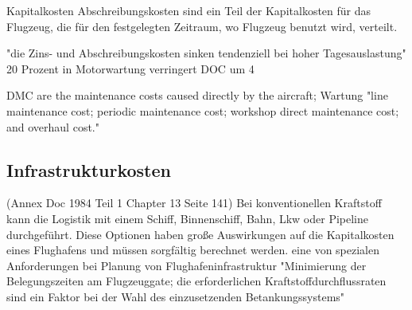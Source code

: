 Kapitalkosten
Abschreibungskosten sind ein Teil der Kapitalkosten für das Flugzeug, die für den festgelegten Zeitraum, wo Flugzeug benutzt wird, verteilt.



"die Zins- und Abschreibungskosten sinken tendenziell bei hoher Tagesauslastung"
20 Prozent in Motorwartung verringert DOC um 4%


DMC are the maintenance costs caused directly by the aircraft; 
Wartung "line maintenance cost;
periodic maintenance cost;
workshop direct maintenance cost; and
overhaul cost."

\subsection{Infrastrukturkosten}

(Annex  Doc 1984 Teil 1 Chapter 13 Seite 141)
Bei konventionellen Kraftstoff kann die Logistik mit einem Schiff, Binnenschiff, Bahn, Lkw oder Pipeline durchgeführt. 
Diese Optionen haben große Auswirkungen auf die Kapitalkosten eines Flughafens und müssen sorgfältig berechnet werden. 
eine von spezialen Anforderungen bei Planung von Flughafeninfrastruktur "Minimierung der Belegungszeiten am Flugzeuggate; 
die erforderlichen Kraftstoffdurchflussraten sind ein Faktor bei der Wahl des einzusetzenden Betankungssystems"